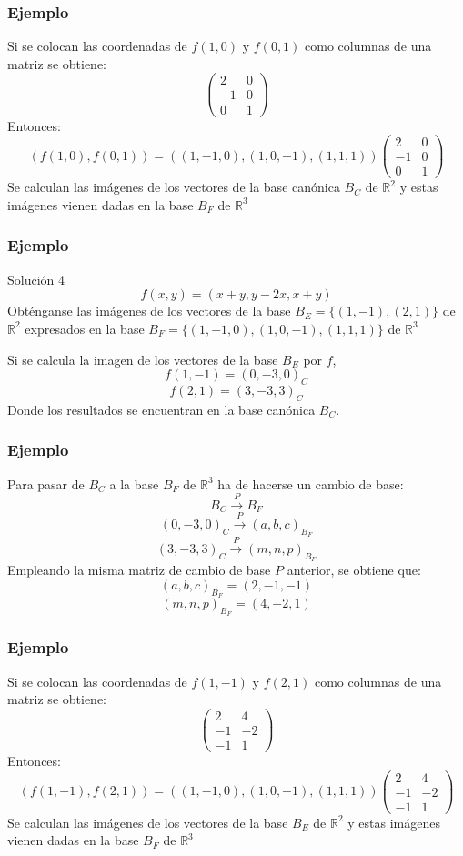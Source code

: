\documentclass{beamer}
\begin{document}
   \begin{frame}
  \frametitle{Ejemplo}
Si se colocan las coordenadas de $f(1,0)$ y $f(0,1)$ como columnas de una matriz se obtiene:
 \[\left(\begin{array}{rr}2 & 0 \\-1 & 0 \\0 & 1\end{array}\right)\]
Entonces:
 \[ (f(1,0), f(0,1)) = ((1,-1,0),(1,0,-1),(1,1,1)) \left(\begin{array}{rr}2 & 0 \\-1 & 0 \\0 & 1\end{array}\right)\]
  Se calculan las im\'agenes de los vectores de la base can\'onica $B_C$ de $\mathbb R^2$ y estas im\'agenes vienen dadas en la base $B_F$ de $\mathbb R^3$
   \end{frame}

     \begin{frame}
  \frametitle{Ejemplo}
 \begin{block}{Soluci\'on 4} 
$$f(x,y) = (x+y, y-2x, x+y)$$
Obt\'enganse las im\'agenes de los vectores de la base $B_E=\{(1,-1),(2,1)\}$ de $\mathbb R^2$ expresados en la base $B_F=\{(1,-1,0),(1,0,-1),(1,1,1)\}$ de $\mathbb R^3$
 \end{block} 
Si se calcula la imagen de los vectores de la base $B_E$ por $f$, 
 \[f(1,-1) = (0,-3,0)_C\]
 \[f(2,1) = (3,-3,3)_C\]
 Donde los resultados se encuentran en la base can\'onica $B_C$.
  \end{frame}

  
\begin{frame}
  \frametitle{Ejemplo}
Para pasar de $B_C$ a la base $B_F$ de $\mathbb R^3$ ha de hacerse un cambio de base:
\[B_C\xrightarrow{P}B_F\]
\[(0,-3,0)_C\xrightarrow{P}(a,b,c)_{B_F}\]
\[(3,-3,3)_C\xrightarrow{P}(m,n,p)_{B_F}\]
Empleando la misma matriz de cambio de base $P$ anterior, se obtiene que:
\[(a,b,c)_{B_F} = (2,-1,-1)\]
\[(m,n,p)_{B_F} = (4,-2,1)\]
  \end{frame}

   \begin{frame}
  \frametitle{Ejemplo}
Si se colocan las coordenadas de $f(1,-1)$ y $f(2,1)$ como columnas de una matriz se obtiene:
 \[\left(\begin{array}{rr}2 & 4 \\-1 & -2 \\-1 & 1\end{array}\right)\]
Entonces:
 \[ (f(1,-1), f(2,1)) = ((1,-1,0),(1,0,-1),(1,1,1)) \left(\begin{array}{rr}2 & 4 \\-1 & -2 \\-1 & 1\end{array}\right)\]
  Se calculan las im\'agenes de los vectores de la base $B_E$ de $\mathbb R^2$ y estas im\'agenes vienen dadas en la base $B_F$ de $\mathbb R^3$
   \end{frame}
\end{document}
